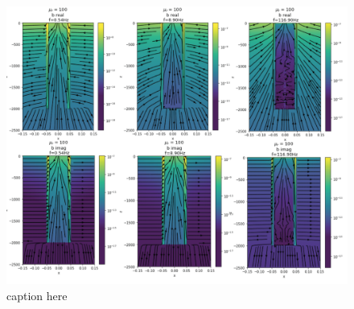 \begin{figure}[htb]
    \begin{center}
    \includegraphics[width=\columnwidth]{figures/casing_software/magnetic_flux_density_mu.png}
    \end{center}
\caption{caption here}
\label{fig:magnetic_flux_density_mu}
\end{figure}
